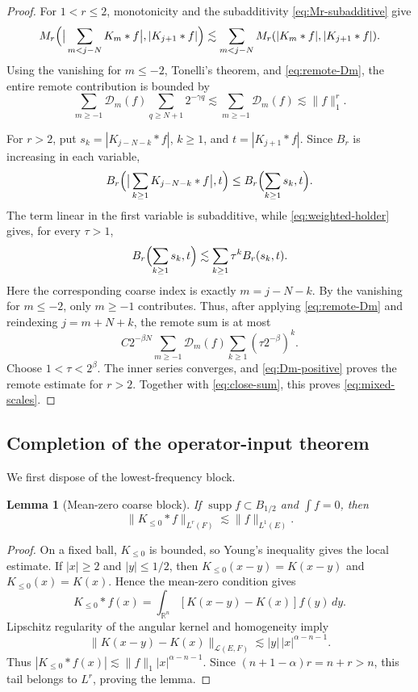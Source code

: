 \documentclass[11pt]{amsart}
\numberwithin{equation}{section}
\newtheorem{lemma}[theorem]{Lemma}
\theoremstyle{definition}
\theoremstyle{remark}
\newcommand{\R}{\mathbb R}
\newcommand{\cL}{\mathcal L}
\newcommand{\supp}{\operatorname{supp}}
\newcommand{\norm}[1]{\lVert #1\rVert}
\begin{document}
\begin{proof}
For $1<r\le2$, monotonicity and the subadditivity
\eqref{eq:Mr-subadditive} give
\[
 M_r\Bigl(\big|\sum_{m<j-N}K_m*f\big|,|K_{j+1}*f|\Bigr)
 \lesssim\sum_{m<j-N}M_r(|K_m*f|,|K_{j+1}*f|).
\]
Using the vanishing for $m\le-2$, Tonelli's theorem, and
\eqref{eq:remote-Dm}, the entire remote contribution is bounded by
\[
 \sum_{m\ge-1}\mathcal D_m(f)
 \sum_{q\ge N+1}2^{-\gamma q}
 \lesssim \sum_{m\ge-1}\mathcal D_m(f)
 \lesssim\norm f_1^r.
\]

For $r>2$, put
$s_k=|K_{j-N-k}*f|$, $k\ge1$, and $t=|K_{j+1}*f|$.  Since $B_r$ is increasing
in each variable,
\[
 B_r\Bigl(\big|\sum_{k\ge1}K_{j-N-k}*f\big|,t\Bigr)
 \le B_r\Bigl(\sum_{k\ge1}s_k,t\Bigr).
\]
The term linear in the first variable is subadditive, while
\eqref{eq:weighted-holder} gives, for every $\tau>1$,
\begin{equation}\label{eq:weighted-Br}
 B_r\Bigl(\sum_{k\ge1}s_k,t\Bigr)
 \lesssim\sum_{k\ge1}\tau^k B_r(s_k,t).
\end{equation}
Here the corresponding coarse index is exactly
$m=j-N-k$.  By the vanishing for $m\le-2$, only $m\ge-1$ contributes.  Thus,
after applying \eqref{eq:remote-Dm} and reindexing $j=m+N+k$, the remote sum
is at most
\[
 C2^{-\beta N}
 \sum_{m\ge-1}\mathcal D_m(f)
 \sum_{k\ge1}(\tau2^{-\beta})^k.
\]
Choose $1<\tau<2^\beta$.  The inner series converges, and
\eqref{eq:Dm-positive} proves the remote estimate for $r>2$.
Together with \eqref{eq:close-sum}, this proves \eqref{eq:mixed-scales}.
\end{proof}


\subsection{Completion of the operator-input theorem}
We first dispose of the lowest-frequency block.

\begin{lemma}[Mean-zero coarse block]\label{lem:coarse-block}
If $\supp f\subset B_{1/2}$ and $\int f=0$, then
\begin{equation}\label{eq:coarse-block}
 \norm{K_{\le0}*f}_{L^r(F)}\lesssim\norm f_{L^1(E)}.
\end{equation}
\end{lemma}

\begin{proof}
On a fixed ball, $K_{\le0}$ is bounded, so Young's inequality gives the local
estimate.  If $|x|\ge2$ and $|y|\le1/2$, then
$K_{\le0}(x-y)=K(x-y)$ and $K_{\le0}(x)=K(x)$.  Hence the mean-zero condition
gives
\[
 K_{\le0}*f(x)
 =\int_{\R^n}[K(x-y)-K(x)]f(y)\,dy.
\]
Lipschitz regularity of the angular kernel and homogeneity imply
\[
 \norm{K(x-y)-K(x)}_{\cL(E,F)}
 \lesssim |y|\,|x|^{\alpha-n-1}.
\]
Thus
$|K_{\le0}*f(x)|\lesssim\norm f_1|x|^{\alpha-n-1}$.  Since
$(n+1-\alpha)r=n+r>n$, this tail belongs to $L^r$, proving the lemma.
\end{proof}
\end{document}
